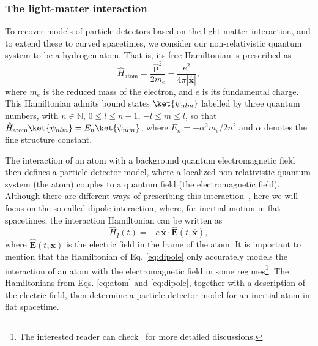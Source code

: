 \documentclass[letterpaper,12pt,titlepage,oneside,final]{book}
\begin{document}
\subsubsection{The light-matter interaction} 

To recover models of particle detectors based on the light-matter interaction, and to extend these to curved spacetimes, we consider our non-relativistic quantum system to be a hydrogen atom. That is, its free Hamiltonian is prescribed as
\begin{equation}\label{eq:atom}
    \hat{H}_\textrm{atom} = \frac{\hat{\bm p}^2}{2 m_e}-\frac{e^2}{4\pi |\hat{\bm x}|},
\end{equation}
where $m_e$ is the reduced mass of the electron, and $e$ is its fundamental charge. This Hamiltonian admits bound states $\ket{\psi_{nlm}}$ labelled by three quantum numbers, with $n\in \mathbb{N}$, $0\leq l \leq n-1$, $-l\leq m \leq l$, so that \mbox{$\hat{H}_\textrm{atom}\ket{\psi_{nlm}} = E_n \ket{\psi_{nlm}}$}, where $E_n = - \alpha^2 m_e/2n^2$ and $\alpha$ denotes the fine structure constant.

The interaction of an atom with a background quantum electromagnetic field then defines a particle detector model, where a localized non-relativistic quantum system (the atom) couples to a quantum field (the electromagnetic field). Although there are different ways of prescribing this interaction~\cite{Nicho1,richard}, here we will focus on the so-called dipole interaction, where, for inertial motion in flat spacetimes, the interaction Hamiltonian can be written as
\begin{equation}\label{eq:dipole}
    \hat{H}_I(t) = -e\,\hat{\bm x}\cdot \hat{\bm E}(t,\hat{\bm x}),
\end{equation}
where $\hat{\bm E}(t,\bm x)$ is the electric field in the frame of the atom. It is important to mention that the Hamiltonian of Eq. \eqref{eq:dipole} only accurately models the interaction of an atom with the electromagnetic field in some regimes\footnote{The interested reader can check~\cite{Nicho1,richard} for more detailed discussions.}. The Hamiltonians from Eqs. \eqref{eq:atom} and \eqref{eq:dipole}, together with a description of the electric field, then determine a particle detector model for an inertial atom in flat spacetime.
\end{document}
